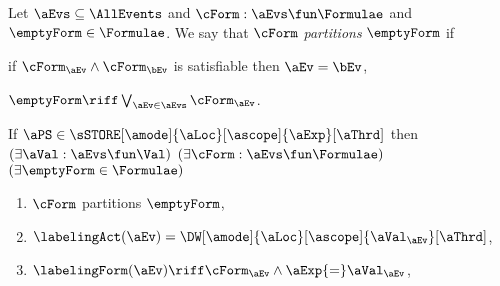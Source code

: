 \begin{definition}
  \label{def:semca}
  \label{def:partition}
  Let $\aEvs\subseteq\AllEvents$ and $\cForm:\aEvs\fun\Formulae$ and
  $\emptyForm\in\Formulae$.  We say that $\cForm$ \emph{partitions}
  $\emptyForm$ if
    \begin{enumerate*}
    \item if $\cForm_\aEv\land\cForm_\bEv$ is satisfiable then $\aEv=\bEv$,
    \item $\emptyForm\riff\bigvee_{\aEv\in\aEvs}\cForm_\aEv$.
    \end{enumerate*}

  
  \noindent
  If $\aPS \in \sSTORE[\amode]{\aLoc}[\ascope]{\aExp}[\aThrd]$ then
  $(\exists\aVal:\aEvs\fun\Val)$
  $(\exists\cForm:\aEvs\fun\Formulae)$
  $(\exists\emptyForm\in\Formulae)$
  \begin{multicols}{2}
  \begin{enumerate}[topsep=0pt,label=(\textsc{w}\arabic*),ref=\textsc{w}\arabic*]
  \item \label{write-E-ca}
    $\cForm$ partitions $\emptyForm$,
  \item \label{write-lambda-ca}
    $\labelingAct(\aEv) = \DW[\amode]{\aLoc}[\ascope]{\aVal_\aEv}[\aThrd]$,
  \item \label{write-kappa-ca}
    \begin{math}
      \labelingForm(\aEv) \riff
      \cForm_\aEv
      \land \aExp{=}\aVal_\aEv
    \end{math},
    

\end{enumerate}
\end{multicols}
\end{definition}
